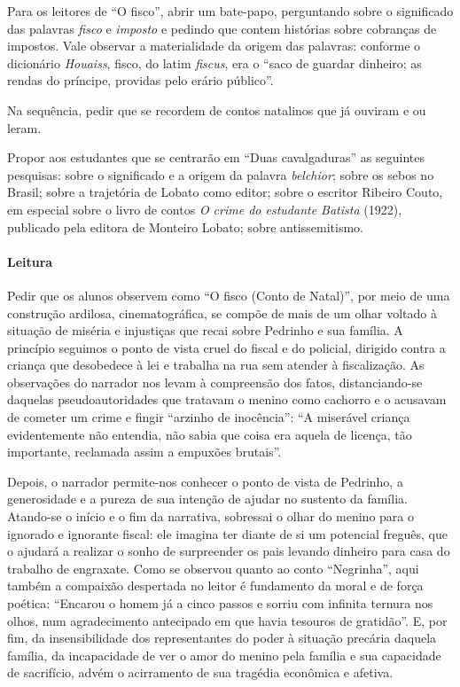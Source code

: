 \documentclass[11pt]{extarticle}
\begin{document}
Para os leitores de ``O fisco'', abrir um bate-papo, perguntando sobre o
significado das palavras \emph{fisco} e \emph{imposto} e pedindo que
contem histórias sobre cobranças de impostos. Vale observar a
materialidade da origem das palavras: conforme o dicionário
\emph{Houaiss}, fisco, do latim \emph{fiscus}, era o ``saco de guardar
dinheiro; as rendas do príncipe, providas pelo erário público''.

Na sequência, pedir que se recordem de contos natalinos que já ouviram e
ou leram.

Propor aos estudantes que se centrarão em ``Duas cavalgaduras'' as
seguintes pesquisas: sobre o significado e a origem da palavra
\emph{belchior}; sobre os sebos no Brasil; sobre a trajetória de Lobato
como editor; sobre o escritor Ribeiro Couto, em especial sobre o livro
de contos \emph{O crime do estudante Batista} (1922), publicado pela
editora de Monteiro Lobato; sobre antissemitismo.

\asterisc\paragraph{Leitura}

Pedir que os alunos observem como ``O fisco (Conto de Natal)'', por meio
de uma construção ardilosa, cinematográfica, se compõe de mais de um
olhar voltado à situação de miséria e injustiças que recai sobre
Pedrinho e sua família. A princípio seguimos o ponto de vista cruel do
fiscal e do policial, dirigido contra a criança que desobedece à lei e
trabalha na rua sem atender à fiscalização. As observações do narrador
nos levam à compreensão dos fatos, distanciando-se daquelas
pseudoautoridades que tratavam o menino como cachorro e o acusavam de
cometer um crime e fingir ``arzinho de inocência'': ``A miserável
criança evidentemente não entendia, não sabia que coisa era aquela de
licença, tão importante, reclamada assim a empuxões brutais''.

Depois, o narrador permite-nos conhecer o ponto de vista de Pedrinho, a
generosidade e a pureza de sua intenção de ajudar no sustento da
família. Atando-se o início e o fim da narrativa, sobressai o olhar do
menino para o ignorado e ignorante fiscal: ele imagina ter diante de si
um potencial freguês, que o ajudará a realizar o sonho de surpreender os
pais levando dinheiro para casa do trabalho de engraxate. Como se
observou quanto ao conto ``Negrinha'', aqui também a compaixão
despertada no leitor é fundamento da moral e de força poética: ``Encarou
o homem já a cinco passos e sorriu com infinita ternura nos olhos, num
agradecimento antecipado em que havia tesouros de gratidão''. E, por
fim, da insensibilidade dos representantes do poder à situação precária
daquela família, da incapacidade de ver o amor do menino pela família e
sua capacidade de sacrifício, advém o acirramento de sua tragédia
econômica e afetiva.
\end{document}
